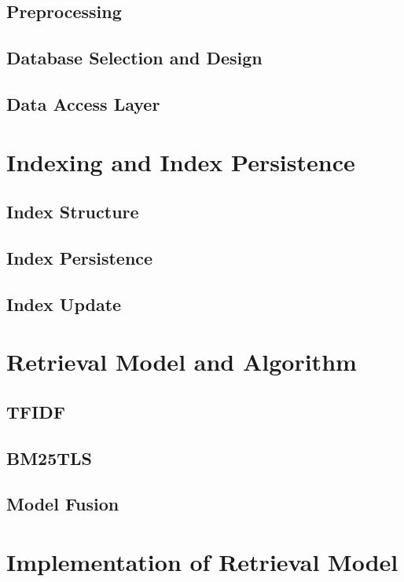 \documentclass[conference]{IEEEtran}
\begin{document}
\subsection{Preprocessing}

\subsection{Database Selection and Design}

\subsection{Data Access Layer}

\section{Indexing and Index Persistence}

\subsection{Index Structure}

\subsection{Index Persistence}

\subsection{Index Update}

\section{Retrieval Model and Algorithm}

\subsection{TFIDF}

\subsection{BM25TLS}

\subsection{Model Fusion}

\section{Implementation of Retrieval Model}
\end{document}
